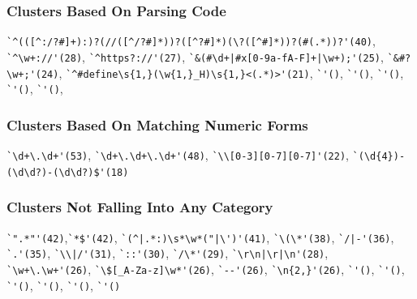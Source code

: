 \subsubsection{Clusters Based On Parsing Code}
\verb!`^(([^:/?#]+):)?(//([^/?#]*))?([^?#]*)(\?([^#]*))?(#(.*))?'(40)!, \verb!`^\w+://'(28)!, \verb!`^https?://'(27)!, \verb!`&(#\d+|#x[0-9a-fA-F]+|\w+);'(25)!,  \verb!`&#?\w+;'(24)!, \verb!`^#define\s{1,}(\w{1,}_H)\s{1,}<(.*)>'(21)!, \verb!`'()!, \verb!`'()!, \verb!`'()!, \verb!`'()!, \verb!`'()!,

\subsubsection{Clusters Based On Matching Numeric Forms}
\verb!`\d+\.\d+'(53)!, \verb!`\d+\.\d+\.\d+'(48)!, \verb!`\\[0-3][0-7][0-7]'(22)!, \verb!`(\d{4})-(\d\d?)-(\d\d?)$'(18)!

\subsubsection{Clusters Not Falling Into Any Category}
\verb!`".*"'(42)!,\verb!`*$'(42)!, \verb!`(^|.*:)\s*\w*("|\')'(41)!, \verb!`\(\*'(38)!, \verb!`/|-'(36)!, \verb!`.'(35)!, \verb!`\\|/'(31)!, \verb!`::'(30)!, \verb!`/\*'(29)!, \verb!`\r\n|\r|\n'(28)!, \verb!`\w+\.\w+'(26)!, \verb!`\$[_A-Za-z]\w*'(26)!, \verb!`--'(26)!, \verb!`\n{2,}'(26)!, \verb!`'()!, \verb!`'()!, \verb!`'()!, \verb!`'()!, \verb!`'()!, \verb!`'()!












